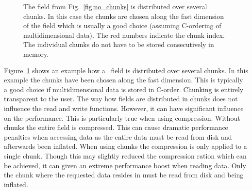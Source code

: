\begin{figure}[tb]
    \centering
    \caption{{\small\label{fig:with_chunks}
    The field from Fig.~\ref{fig:no_chunks} is distributed over several chunks. 
    In this case the chunks are chosen along the fast dimension of the field 
    which is usually a good choice (assuming C-ordering of multidimensional
    data). The red numbers indicate the chunk index. The individual chunks do
    not have to be stored consecutively  in memory.
    }}
\end{figure}
Figure~\ref{fig:with_chunks} shows an example how a \nexus\ field is distributed
over several chunks. In this example the chunks have been chosen along the 
fast dimension. This is typically a good choice if multidimensional data is
stored in C-order. 
Chunking is entirely transparent to the user. The way how fields are distributed
in chunks does not influence the read and write functions. However, it can have
significant influence on the performance. This is particularly true when using
compression. Without chunks the entire field is compressed. This can cause
dramatic performance penalties when accessing data as the entire data must be
read from disk and afterwards been inflated. When using chunks the compression
is only applied to a single chunk. Though this may slightly reduced the
compression ration which can be achieved, it can given an extreme performance
boost when reading data. Only the chunk where the requested data resides in must
be read from disk and being inflated. 

